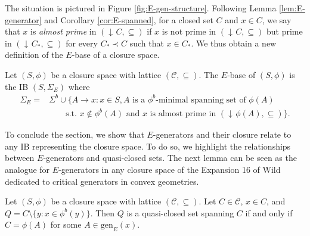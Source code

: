\documentclass[12pt, a4paper]{article}
\newcommand{\cc}[1]{\mathcal{#1}}  %
\newcommand{\st}{:}  %
\newcommand{\U}{S}  %
\DeclareMathOperator{\idl}{\downarrow\!}  %
\newcommand{\cl}{\phi}  %
\newcommand{\cs}{\cc{C}} %
\newcommand{\gen}{\mathrm{gen}}  %
\newcommand{\imp}{\rightarrow}  %
\newcommand{\is}{\Sigma}  %
\begin{document}
The situation is pictured in Figure \ref{fig:E-gen-structure}.
Following Lemma \ref{lem:E-generator} and Corollary \ref{cor:E-spanned}, for a closed set $C$ and $x \in C$, we say that $x$ is \emph{almost prime} in $(\idl C, \subseteq)$ if $x$ is not prime in $(\idl C, \subseteq)$ but prime in $(\idl C_*, \subseteq)$ for every $C_* \prec C$ such that $x \in C_*$.
We thus obtain a new definition of the $E$-base of a closure space.

\begin{definition}[$E$-base] \label{def:E-base-prime}
Let $(\U, \cl)$ be a closure space with lattice $(\cs, \subseteq)$.
The $E$-base of $(\U, \cl)$ is the IB $(\U, \is_E)$ where 
%
\[
\begin{split}
\is_E = & \is^b \cup \{A \imp x \st x \in \U,  A \text{ is a $\cl^b$-minimal spanning set of $\cl(A)$} \\
        & \quad\quad \text{s.t.\ } x \notin \cl^b(A) \text{ and $x$ is almost prime in } (\idl \cl(A), \subseteq)\}.
\end{split}
\] 
%
\end{definition}

To conclude the section, we show that $E$-generators and their closure relate to any IB representing the closure space.
To do so, we highlight the relationships between $E$-generators and quasi-closed sets.
The next lemma can be seen as the analogue for $E$-generators in any closure space of the Expansion 16 of Wild \cite{wild2017joy} dedicated to critical generators in convex geometries.

\begin{lemma} \label{lem:E-QC}
Let $(\U, \cl)$ be a closure space with lattice $(\cs, \subseteq)$.
Let $C \in \cs$, $x \in C$, and $Q = C \setminus \{y \st x \in \cl^b(y)\}$.
Then $Q$ is a quasi-closed set spanning $C$ if and only if $C = \cl(A)$ for some $A \in \gen_E(x)$.
\end{lemma}
\end{document}
